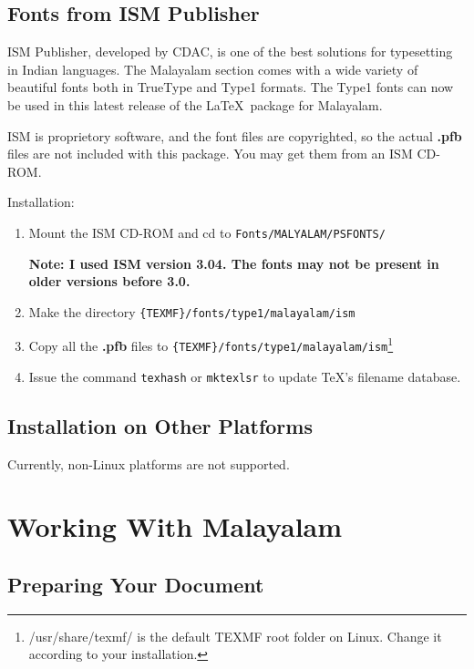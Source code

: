 \documentclass[12pt]{article}
\begin{document}
{\subsection{Fonts from ISM Publisher}

ISM Publisher, developed by CDAC, is one of the best solutions for
typesetting in Indian languages. The Malayalam section comes with a wide variety
of beautiful fonts both in TrueType and Type1 formats. The Type1 fonts
can now be used in this latest release of the \LaTeX\ package
for Malayalam.

ISM is proprietory software, and the font files are copyrighted,
so the actual \textbf{.pfb} files are not included with this package.
You may get them from an ISM CD-ROM.

Installation:

\begin{enumerate}

\item Mount the ISM CD-ROM and cd to \verb"Fonts/MALYALAM/PSFONTS/"

\textbf{Note: I used ISM version 3.04. The fonts may not be present
in older versions before 3.0.}

\item Make the directory \verb"{TEXMF}/fonts/type1/malayalam/ism"

\item Copy all the \textbf{.pfb} files to \verb"{TEXMF}/fonts/type1/malayalam/ism"\footnote{/usr/share/texmf/ is the default TEXMF
root folder on Linux. Change it according to your installation.}

\item Issue the command \texttt{texhash} or \texttt{mktexlsr} to update
\TeX{}'s filename database.

\end{enumerate}


\subsection{Installation on Other Platforms}

Currently, non-Linux platforms are not supported.

\vfill\eject

\section{Working With Malayalam}

\subsection{Preparing Your Document}

}
\end{document}
